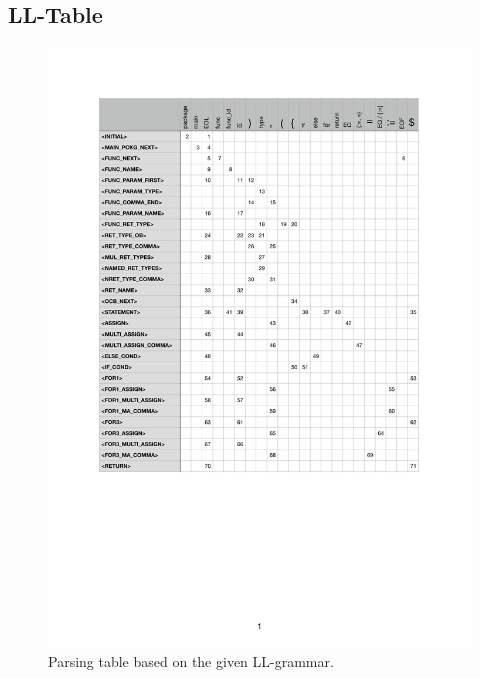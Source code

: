 \documentclass[12pt]{article}
\begin{document}
\subsection{LL-Table}
\label{sec:llgrammartable}
\begin{figure}[H]
	\centering
		\includegraphics[width=1\linewidth]{img/parsing_table.pdf}
		\caption{Parsing table based on the given LL-grammar.}
		
\end{figure}	
\end{document}
